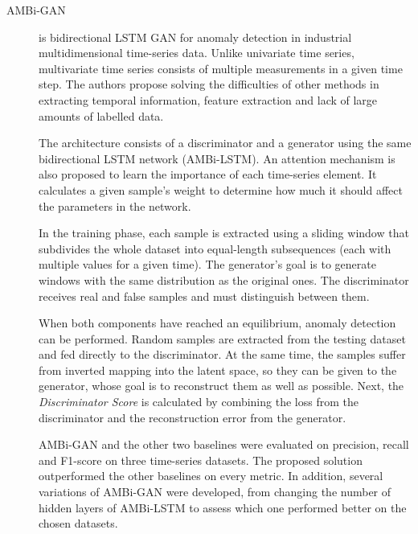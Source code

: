 \begin{description}
    \item[AMBi-GAN \cite{kong.etal_IntegratedGenerativeModel_2023}] is bidirectional LSTM GAN for anomaly detection in industrial multidimensional time-series data. Unlike univariate time series, multivariate time series consists of multiple measurements in a given time step. The authors propose solving the difficulties of other methods in extracting temporal information, feature extraction and lack of large amounts of labelled data.

    The architecture consists of a discriminator and a generator using the same bidirectional LSTM network (AMBi-LSTM). An attention mechanism is also proposed to learn the importance of each time-series element. It calculates a given sample's weight to determine how much it should affect the parameters in the network.

    In the training phase, each sample is extracted using a sliding window that subdivides the whole dataset into equal-length subsequences (each with multiple values for a given time). The generator's goal is to generate windows with the same distribution as the original ones. The discriminator receives real and false samples and must distinguish between them.

    When both components have reached an equilibrium, anomaly detection can be performed. Random samples are extracted from the testing dataset and fed directly to the discriminator. At the same time, the samples suffer from inverted mapping into the latent space, so they can be given to the generator, whose goal is to reconstruct them as well as possible. Next, the \textit{Discriminator Score} is calculated by combining the loss from the discriminator and the reconstruction error from the generator. 

    AMBi-GAN and the other two baselines were evaluated on precision, recall and F1-score on three time-series datasets. The proposed solution outperformed the other baselines on every metric. In addition, several variations of AMBi-GAN were developed, from changing the number of hidden layers of AMBi-LSTM to assess which one performed better on the chosen datasets.
\end{description}


